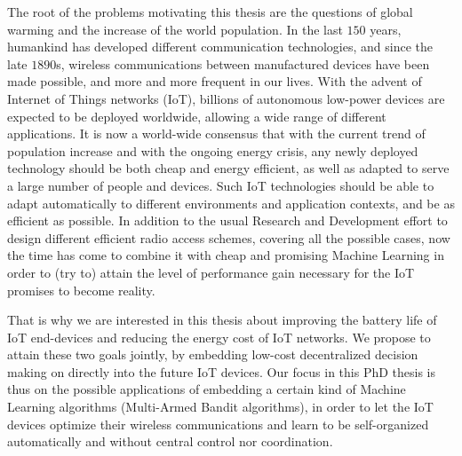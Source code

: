 %
The root of the problems motivating this thesis are the questions of global warming and the increase of the world population.
In the last $150$ years, humankind has developed different communication technologies, and since the late $1890$s, wireless communications between manufactured devices have been made possible, and more and more frequent in our lives.
With the advent of Internet of Things networks (IoT), billions of autonomous low-power devices are expected to be deployed worldwide, allowing a wide range of different applications.
It is now a world-wide consensus that with the current trend of population increase and with the ongoing energy crisis, any newly deployed technology should be both cheap and energy efficient,
as well as adapted to serve a large number of people and devices.
%
Such IoT technologies should be able to adapt automatically to different environments and application contexts, and be as efficient as possible.
%
In addition to the usual Research and Development effort to design different efficient radio access schemes, covering all the possible cases,
now the time has come to combine it with cheap and promising Machine Learning in order to (try to) attain the level of performance gain necessary for the IoT promises to become reality.

That is why we are interested in this thesis about
improving the battery life of IoT end-devices and reducing the energy cost of IoT networks.
We propose to attain these two goals jointly, by embedding low-cost decentralized decision making on directly into the future IoT devices.
%
Our focus in this PhD thesis is thus on the possible applications of embedding a certain kind of Machine Learning algorithms (Multi-Armed Bandit algorithms), in order to let the IoT devices optimize their wireless communications and learn to be self-organized automatically and without central control nor coordination.


